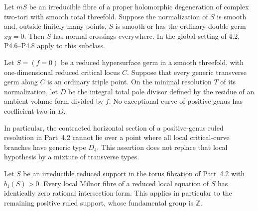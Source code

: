 
\begin{proposition}[P4.20]\hypertarget{tag-02WS}{}\label{night:P4.20}\label{stmt:P4.20}


Let $mS$ be an irreducible fibre of a proper holomorphic
degeneration of complex two-tori with smooth total threefold.
Suppose the normalization of $S$ is smooth and, outside
finitely many points, $S$ is smooth or has the ordinary-double
germ $xy=0$. Then $S$ has normal crossings everywhere.
In the global setting of 4.2, P4.6--P4.8 apply to this subclass.
\end{proposition}

\begin{proposition}[P4.39]\hypertarget{tag-02XC}{}\label{night:P4.39}\label{stmt:P4.39}


Let $S=(f=0)$ be a reduced hypersurface germ in a smooth
threefold, with one-dimensional reduced critical locus $C$.
Suppose that every generic transverse germ along $C$ is an
ordinary triple point. On the minimal resolution $T$ of its
normalization, let $D$ be the integral total pole divisor
defined by the residue of an ambient volume form divided by
$f$. No exceptional curve of positive genus has coefficient
two in $D$.

In particular, the contracted horizontal section of a
positive-genus ruled resolution in Part~4.2 cannot lie over
a point where all local critical-curve branches have generic
type $D_4$. This assertion does not replace that local
hypothesis by a mixture of transverse types.
\end{proposition}

\begin{proposition}[P4.51]\hypertarget{tag-02XQ}{}\label{night:P4.51}\label{stmt:P4.51}


Let $S$ be an irreducible reduced support in the torus
fibration of Part~4.2 with $b_1(S)>0$. Every local
Milnor fibre of a reduced local equation of $S$ has
identically zero rational intersection form. This applies
in particular to the remaining positive ruled support,
whose fundamental group is $\mathbb Z$.
\end{proposition}

